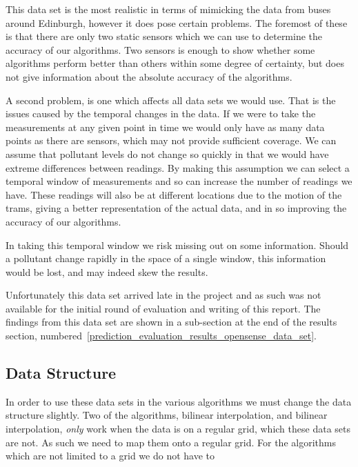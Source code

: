 
				This data set is the most realistic in terms of mimicking the data from buses around Edinburgh, however it does pose certain problems. The foremost of these is that there are only two static sensors which we can use to determine the accuracy of our algorithms. Two sensors is enough to show whether some algorithms perform better than others within some degree of certainty, but does not give information about the absolute accuracy of the algorithms. 

				A second problem, is one which affects all data sets we would use. That is the issues caused by the temporal changes in the data. If we were to take the measurements at any given point in time we would only have as many data points as there are sensors, which may not provide sufficient coverage. We can assume that pollutant levels do not change so quickly in that we would have extreme differences between readings. By making this assumption we can select a temporal window of measurements and so can increase the number of readings we have. These readings will also be at different locations due to the motion of the trams, giving a better representation of the actual data, and in so improving the accuracy of our algorithms. 

				In taking this temporal window we risk missing out on some information. Should a pollutant change rapidly in the space of a single window, this information would be lost, and may indeed skew the results. 

				Unfortunately this data set arrived late in the project and as such was not available for the initial round of evaluation and writing of this report. The findings from this data set are shown in a sub-section at the end of the results section, numbered~\ref{prediction_evaluation_results_opensense_data_set}.
		\subsection{Data Structure}\label{prediction_evaluation_methodology_data_structure}
			
			In order to use these data sets in the various algorithms we must change the data structure slightly. Two of the algorithms, bilinear interpolation, and bilinear interpolation, \emph{only} work when the data is on a regular grid, which these data sets are not. As such we need to map them onto a regular grid. For the algorithms which are not limited to a grid we do not have to

